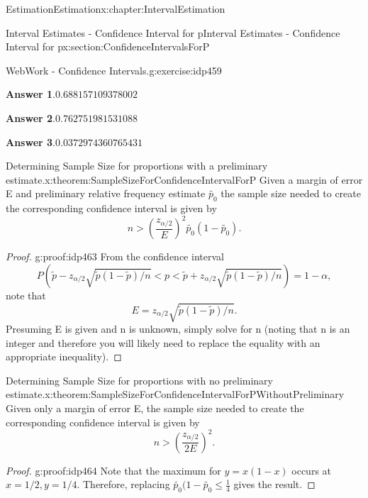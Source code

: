 \documentclass[oneside,10pt,]{book}
\newcommand{\blocktitlefont}{\relax}
\numberwithin{equation}{section}
\newcommand{\lt}{<}
\newcommand{\gt}{>}
\begin{document}
\begin{chapterptx}{Estimation}{}{Estimation}{}{}{x:chapter:IntervalEstimation}
\begin{sectionptx}{Interval Estimates - Confidence Interval for p}{}{Interval Estimates - Confidence Interval for p}{}{}{x:section:ConfidenceIntervalsForP}
\begin{inlineexercise}{WebWork - Confidence Intervals.}{g:exercise:idp459}
\begin{itemize}[label=$\odot$,leftmargin=3em,]
\end{itemize}
%
\par\smallskip%
\noindent\textbf{\blocktitlefont Answer 1}.\hypertarget{g:answer:idp460}{}\quad{}\(0.688157109378002\)%
\par\smallskip%
\noindent\textbf{\blocktitlefont Answer 2}.\hypertarget{g:answer:idp461}{}\quad{}\(0.762751981531088\)%
\par\smallskip%
\noindent\textbf{\blocktitlefont Answer 3}.\hypertarget{g:answer:idp462}{}\quad{}\(0.0372974360765431\)%
\end{inlineexercise}%
\begin{theorem}{Determining Sample Size for proportions with a preliminary estimate.}{}{x:theorem:SampleSizeForConfidenceIntervalForP}%
Given a margin of error E and preliminary relative frequency estimate \(\tilde{p_0}\) the sample size needed to create the corresponding confidence interval is given by%
\begin{equation*}
n \gt \left ( \frac{z_{\alpha /2}}{E} \right )^2 \tilde{p_0}(1-\tilde{p_0}).
\end{equation*}
%
\end{theorem}
\begin{proof}{}{g:proof:idp463}
From the confidence interval%
\begin{equation*}
P( \tilde{p} - z_{ \alpha/2}\sqrt{\tilde{p}(1-\tilde{p})/n} \lt  p \lt \tilde{p} + z_{ \alpha/2}\sqrt{\tilde{p}(1-\tilde{p})/n}) = 1 - \alpha,
\end{equation*}
note that%
\begin{equation*}
E = z_{ \alpha/2}\sqrt{\tilde{p}(1-\tilde{p})/n}.
\end{equation*}
Presuming E is given and n is unknown, simply solve for n (noting that n is an integer and therefore you will likely need to replace the equality with an appropriate inequality).%
\end{proof}
\begin{theorem}{Determining Sample Size for proportions with no preliminary estimate.}{}{x:theorem:SampleSizeForConfidenceIntervalForPWithoutPreliminary}%
Given only a margin of error E, the sample size needed to create the corresponding confidence interval is given by%
\begin{equation*}
n \gt \left ( \frac{z_{\alpha /2}}{2 E} \right )^2 .
\end{equation*}
%
\end{theorem}
\begin{proof}{}{g:proof:idp464}
Note that the maximum for \(y = x(1-x) \) occurs at \(x = 1/2, y = 1/4.\) Therefore, replacing \(\tilde{p_0}(1-\tilde{p_0} \le \frac{1}{4}\) gives the result.%

\end{proof}
\end{sectionptx}
\end{chapterptx}
\end{document}
